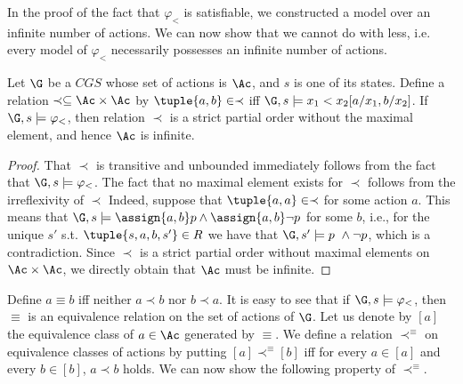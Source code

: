    In the proof of the fact that $\varphi_<$ is satisfiable, we constructed a model over an infinite number of actions. We can now show that we cannot do with less, i.e. every model of $\varphi_<$ necessarily possesses an infinite number of actions. 

   \begin{lemma}
       Let $\G$ be a $CGS$ whose set of actions is $\Ac$, and $s$ is one of its states. Define a relation $\prec \subseteq \Ac \times \Ac$ by $\tuple{a,b}\in \prec $ iff $\G,s\models x_1 < x_2[a/x_1, b/x_2]$. If $\G,s\models \varphi_{<}$, then relation $\prec$ is a strict partial order without the maximal element, and hence $\Ac$ is infinite. 
   \end{lemma}
   \begin{proof}
     That $\prec$ is transitive and unbounded immediately follows from the fact that $\G,s\models \varphi_<$. The fact that no maximal element exists for $\prec$ follows from the irreflexivity of $\prec$ %
     Indeed, suppose that $\tuple{a,a}\in \prec$ for some action $a$. This means that $\G,s\models \assign{a,b} p \land \assign{a,b}\neg p$ for some $b$, i.e., for the unique $s'$ s.t. $\tuple{s,a,b,s'}\in R$ we have  that $\G,s'\models p\ \land \neg p$, which is a contradiction. %
     Since $\prec$ is a strict partial order without maximal elements on $\Ac \times \Ac$, we directly obtain that $\Ac$ must be infinite. 
   \end{proof}


Define $a\equiv b$ iff neither $a\prec b$ nor $b\prec a$. It is easy to see that if $\G,s\models \varphi_<$, then $\equiv$ is an equivalence relation on the set of actions of $\G$. Let us denote by $[a]$ the equivalence class of $a\in \Ac$ generated by $\equiv$. We define a  relation $\prec^\equiv$ on equivalence classes of actions by putting $[a]\prec^\equiv [b]$ iff for every $a\in [a]$ and every $b\in [b]$,  $a\prec b$ holds. We can now show the following property of $\prec^\equiv$. %

